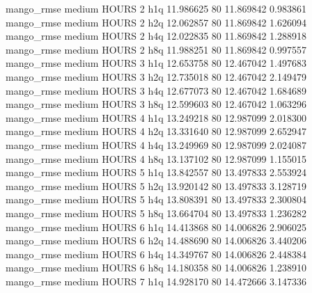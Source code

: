        mango_rmse     medium    HOURS                 2                  h1q 11.986625 80      11.869842           0.983861
       mango_rmse     medium    HOURS                 2                  h2q 12.062857 80      11.869842           1.626094
       mango_rmse     medium    HOURS                 2                  h4q 12.022835 80      11.869842           1.288918
       mango_rmse     medium    HOURS                 2                  h8q 11.988251 80      11.869842           0.997557
       mango_rmse     medium    HOURS                 3                  h1q 12.653758 80      12.467042           1.497683
       mango_rmse     medium    HOURS                 3                  h2q 12.735018 80      12.467042           2.149479
       mango_rmse     medium    HOURS                 3                  h4q 12.677073 80      12.467042           1.684689
       mango_rmse     medium    HOURS                 3                  h8q 12.599603 80      12.467042           1.063296
       mango_rmse     medium    HOURS                 4                  h1q 13.249218 80      12.987099           2.018300
       mango_rmse     medium    HOURS                 4                  h2q 13.331640 80      12.987099           2.652947
       mango_rmse     medium    HOURS                 4                  h4q 13.249969 80      12.987099           2.024087
       mango_rmse     medium    HOURS                 4                  h8q 13.137102 80      12.987099           1.155015
       mango_rmse     medium    HOURS                 5                  h1q 13.842557 80      13.497833           2.553924
       mango_rmse     medium    HOURS                 5                  h2q 13.920142 80      13.497833           3.128719
       mango_rmse     medium    HOURS                 5                  h4q 13.808391 80      13.497833           2.300804
       mango_rmse     medium    HOURS                 5                  h8q 13.664704 80      13.497833           1.236282
       mango_rmse     medium    HOURS                 6                  h1q 14.413868 80      14.006826           2.906025
       mango_rmse     medium    HOURS                 6                  h2q 14.488690 80      14.006826           3.440206
       mango_rmse     medium    HOURS                 6                  h4q 14.349767 80      14.006826           2.448384
       mango_rmse     medium    HOURS                 6                  h8q 14.180358 80      14.006826           1.238910
       mango_rmse     medium    HOURS                 7                  h1q 14.928170 80      14.472666           3.147336
